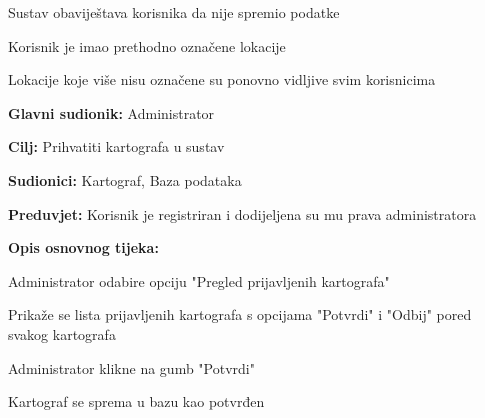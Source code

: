 \begin{packed_item}
\begin{packed_item}
\begin{packed_enum}
			\item Sustav obaviještava korisnika da nije spremio podatke
			
		\end{packed_enum}
		\item[4.b] Korisnik je imao prethodno označene lokacije
		\item[] \begin{packed_enum}
			
			\item Lokacije koje više nisu označene su ponovno vidljive svim korisnicima
			
		\end{packed_enum}
	\end{packed_item}
\end{packed_item}


\noindent {}
\begin{packed_item}
	
	\item \textbf{Glavni sudionik: } Administrator
	\item  \textbf{Cilj:} Prihvatiti kartografa u sustav
	\item  \textbf{Sudionici:} Kartograf, Baza podataka
	\item  \textbf{Preduvjet:} Korisnik je registriran i dodijeljena su mu prava administratora
	\item  \textbf{Opis osnovnog tijeka:}
	
	\item[] \begin{packed_enum}
		
		\item Administrator odabire opciju "Pregled prijavljenih kartografa"
		\item Prikaže se lista prijavljenih kartografa s opcijama "Potvrdi" i "Odbij" pored svakog kartografa
		\item Administrator klikne na gumb "Potvrdi"
		\item Kartograf se sprema u bazu kao potvrđen
	\end{packed_enum}
\end{packed_item}

